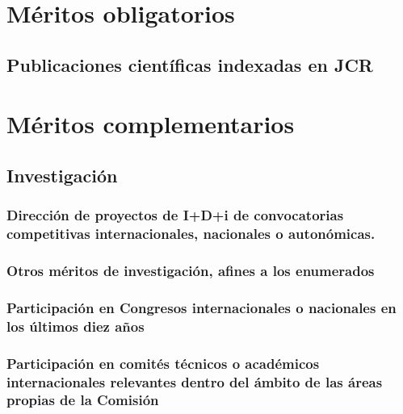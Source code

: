\section{Méritos obligatorios}
\newpage\subsection{Publicaciones científicas indexadas en JCR}
\newpage
\newpage
\newpage
\newpage
\newpage
\newpage
\newpage
\newpage
\newpage
\newpage
\newpage
\newpage
\newpage
\newpage
\newpage
\newpage
\newpage\section{Méritos complementarios}
\newpage\subsection{Investigación}
\newpage\subsubsection{Dirección de proyectos de I+D+i de convocatorias competitivas internacionales, nacionales o autonómicas.}
\newpage\subsubsection{Otros méritos de investigación, afines a los enumerados}
\newpage\subsubsection{Participación en Congresos internacionales o nacionales en los últimos diez años}
\newpage\subsubsection{Participación en comités técnicos o académicos internacionales relevantes dentro del ámbito de las áreas propias de la Comisión }
